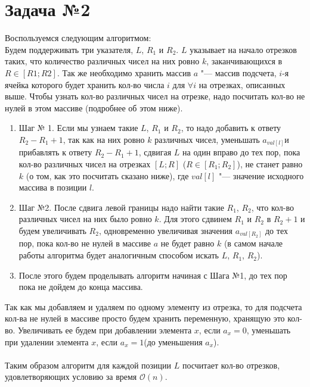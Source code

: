 \documentclass{article}
\begin{document}
\section*{Задача №2}
Воспользуемся следующим алгоритмом:
\\
Будем поддерживать три указателя, $L$, $R_1$ и $R_2$. $L$ указывает на начало отрезков таких, что количество различных чисел на них ровно $k$, заканчивающихся в $R \in [R1; R2]$. Так же необходимо хранить массив $a$ "--- массив подсчета, $i$-я ячейка которого будет хранить кол-во числа $i$ для $\forall i$ на отрезках, описанных выше. Чтобы узнать кол-во различных чисел на отрезке, надо посчитать кол-во не нулей в этом массиве (подробнее об этом ниже). 
\begin{enumerate}
\item[] Шаг № 1.
Если мы узнаем такие $L$, $R_1$ и $R_2$, то надо добавить к ответу $R_2 - R_1 + 1$, так как на них ровно $k$ различных чисел, уменьшать $a_{val[l]}$и прибавлять к ответу $R_2 - R_1 + 1$, сдвигая $L$ на один вправо до тех пор, пока кол-во различных чисел на отрезках $[L; R]$ ($R \in [R_1; R_2]$), не станет равно $k$ (о том, как это посчитать сказано ниже), где $val[l]$ "--- значение исходного массива в позиции $l$.
\item[] Шаг №2.
После сдвига левой границы надо найти такие $R_1$, $R_2$, что кол-во различных чисел на них было ровно $k$. Для этого сдвинем $R_1$ и $R_2$ в $R_2 + 1$ и будем увеличивать $R_2$, одновременно увеличивая значения $a_{val[R_2]}$ до тех пор, пока кол-во не нулей в массиве $a$ не будет равно $k$ (в самом начале работы алгоритма будет аналогичным способом искать $L$, $R_1$, $R_2$). 

\item[] После этого будем проделывать алгоритм начиная с Шага №1, до тех пор пока не дойдем до конца массива.

\end{enumerate}
Так как мы добавляем и удаляем по одному элементу из отрезка, то для подсчета кол-ва не нулей в массиве просто будем хранить переменную, хранящую это кол-во. Увеличивать ее будем при добавлении элемента $x$, если $a_x = 0$, уменьшать при удалении элемента $x$, если $a_x = 1$(до уменьшения $a_x$).
\\\\
Таким образом алгоритм для каждой позиции $L$ посчитает кол-во отрезков, удовлетворяющих условию за время $\mathcal{O}(n)$.
\end{document}
